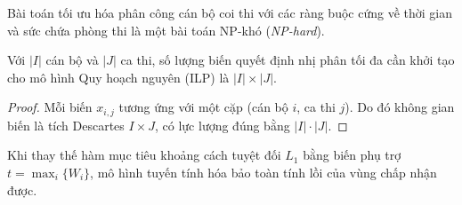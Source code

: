 \begin{theorem}
\label{thm:np_hard}
Bài toán tối ưu hóa phân công cán bộ coi thi với các ràng buộc cứng về thời gian và sức chứa phòng thi là một bài toán NP-khó (\textit{NP-hard}).
\end{theorem}

\begin{lemma}
\label{lem:binary_bound}
Với $|I|$ cán bộ và $|J|$ ca thi, số lượng biến quyết định nhị phân tối đa cần khởi tạo cho mô hình Quy hoạch nguyên (ILP) là $|I| \times |J|$.
\end{lemma}

\begin{proof}
Mỗi biến $x_{i,j}$ tương ứng với một cặp (cán bộ $i$, ca thi $j$). Do đó không gian biến là tích Descartes $I \times J$, có lực lượng đúng bằng $|I| \cdot |J|$.
\end{proof}

\begin{property}
Khi thay thế hàm mục tiêu khoảng cách tuyệt đối $L_1$ bằng biến phụ trợ $t = \max_i \{W_i\}$, mô hình tuyến tính hóa bảo toàn tính lồi của vùng chấp nhận được.
\end{property}
